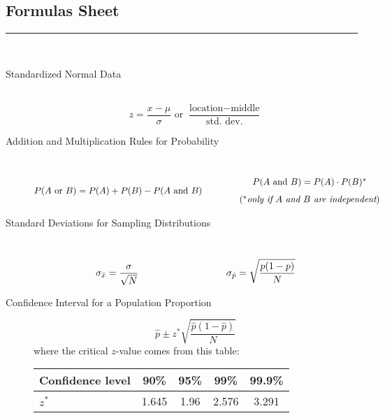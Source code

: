 \documentclass[12pt]{exam}
\begin{document}
\pagestyle{empty}
\subsection*{Formulas Sheet}
\hrule 
~

\begin{description}
\item[Standardized Normal Data] ~ \\
$$z = \displaystyle \frac{x - \mu}{\sigma} \text{ or } \frac{\text{location} - \text{middle}}{\text{std. dev.}}$$ 
\vfill

\item[Addition and Multiplication Rules for Probability] ~ \\
$$P(A \text{ or } B) = P(A)+P(B)-P(A \text{ and } B) \hspace*{0.5in} \begin{array}{c} P(A \text{ and } B) = P(A) \cdot P(B)^* \\[0.1in] (^*\textit{only if } A \textit{ and } B \textit{ are independent}) \end{array}$$

\vfill


\item[Standard Deviations for Sampling Distributions] ~ \\
$$\displaystyle  \sigma_{\bar{x}} = \frac{\sigma}{\sqrt{N}} \hspace*{1.25in} \sigma_{\hat{p}} = \sqrt{\frac{p(1-p)}{N}} $$

\vfill



\item[Confidence Interval for a Population Proportion]
$$\hat{p} \pm z^* \sqrt{\frac{\hat{p}(1-\hat{p})}{N}}$$
where the critical $z$-value comes from this table:
\begin{center}
\begin{tabular}{l|c|c|c|c}
Confidence level & 90\% & 95\% & 99\% & 99.9\% \\ \hline
$z^*$ & 1.645 & 1.96 & 2.576 & 3.291 \\
\end{tabular}
\end{center}

\vfill
\vfill

\end{description}
\end{document}
